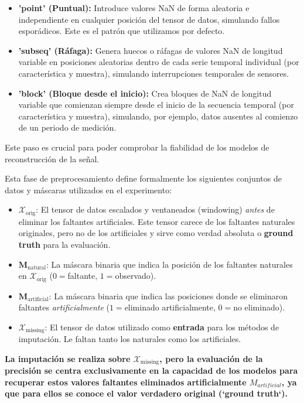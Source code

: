 \begin{enumerate}
\begin{itemize}
\item \textbf{'point' (Puntual):} Introduce valores NaN de forma aleatoria e independiente en cualquier posición del tensor de datos, simulando fallos esporádicos. Este es el patrón que utilizamos por defecto.
\item \textbf{'subseq' (Ráfaga):} Genera huecos o ráfagas de valores NaN de longitud variable en posiciones aleatorias dentro de cada serie temporal individual (por característica y muestra), simulando interrupciones temporales de sensores.
\item \textbf{'block' (Bloque desde el inicio):} Crea bloques de NaN de longitud variable que comienzan siempre desde el inicio de la secuencia temporal (por característica y muestra), simulando, por ejemplo, datos ausentes al comienzo de un periodo de medición.
\end{itemize}
Este paso es crucial para poder comprobar la fiabilidad de los modelos de reconstrucción de la señal.
\end{enumerate}


Esta fase de preprocesamiento define formalmente los siguientes conjuntos de datos y máscaras utilizados en el experimento:

\begin{itemize}
    \item \textbf{$\mathcal{X}_{\text{orig}}$}: El tensor de datos escalados y ventaneados (windowing) \textit{antes} de eliminar los faltantes artificiales. Este tensor carece de los faltantes naturales originales, pero no de los artificiales y sirve como verdad absoluta o \textbf{ground truth} para la evaluación.
    \item \textbf{$\mathbf{M}_{\text{natural}}$}: La máscara binaria que indica la posición de los faltantes naturales en $\mathcal{X}_{\text{orig}}$ ($0=$faltante, $1=$observado).
    \item \textbf{$\mathbf{M}_{\text{artificial}}$}: La máscara binaria que indica las posiciones donde se eliminaron faltantes \textit{artificialmente} ($1=$eliminado artificialmente, $0=$no eliminado).
    \item \textbf{$\mathcal{X}_{\text{missing}}$}: El tensor de datos utilizado como \textbf{entrada} para los métodos de imputación. Le faltan tanto los naturales como los artificiales.

    
\end{itemize}

\textbf{La imputación se realiza sobre \textbf{$\mathcal{X}_{\text{missing}}$}, pero la evaluación de la precisión se centra exclusivamente en la capacidad de los modelos para recuperar estos valores faltantes eliminados artificialmente \textbf{$M_{artificial}$}, ya que para ellos se conoce el valor verdadero original (`ground truth`).}

